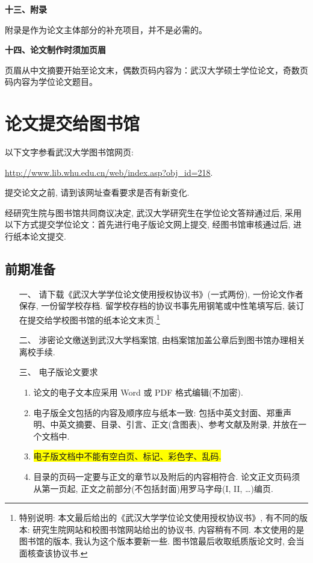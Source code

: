 \documentclass{WHUMaster}   %
\begin{document}
\textbf{十三、附录}

附录是作为论文主体部分的补充项目，并不是必需的。



\textbf{十四、论文制作时须加页眉}


页眉从中文摘要开始至论文末，偶数页码内容为：武汉大学硕士学位论文，奇数页码内容为学位论文题目。



\chapter{论文提交给图书馆}


{\kaishu 以下文字参看武汉大学图书馆网页:
 \begin{center}
 \url{http://www.lib.whu.edu.cn/web/index.asp?obj_id=218}.
 \end{center}
 提交论文之前, 请到该网址查看要求是否有新变化.}

 \bigskip

    经研究生院与图书馆共同商议决定, 武汉大学研究生在学位论文答辩通过后,
    采用以下方式提交学位论文：首先进行电子版论文网上提交, 经图书馆审核通过后, 进行纸本论文提交.

\section*{前期准备}
\begin{itemize}
  \item[一、] 请下载《武汉大学学位论文使用授权协议书》(一式两份), 一份论文作者保存, 一份留学校存档.
    留学校存档的协议书事先用钢笔或中性笔填写后,  装订在提交给学校图书馆的纸本论文末页.\footnote{\heiti 特别说明:
    本文最后给出的《武汉大学学位论文使用授权协议书》, 有不同的版本: 研究生院网站和校图书馆网站给出的协议书, 内容稍有不同.
    本文使用的是图书馆的版本, 我认为这个版本要新一些. 图书馆最后收取纸质版论文时, 会当面核查该协议书.}

    \item[二、]涉密论文缴送到武汉大学档案馆, 由档案馆加盖公章后到图书馆办理相关离校手续.

    \item[三、]电子版论文要求
\begin{enumerate}[1.]
  \item 论文的电子文本应采用 Word 或 PDF 格式编辑(不加密).
  \item 电子版全文包括的内容及顺序应与纸本一致: 包括中英文封面、郑重声明、中英文摘要、目录、引言、正文(含图表)、参考文献及附录, 并放在一个文档中.
  \item \colorbox{yellow}{电子版文档中不能有空白页、标记、彩色字、乱码.}
  \item 目录的页码一定要与正文的章节以及附后的内容相符合. 论文正文页码须从第一页起, 正文之前部分(不包括封面)用罗马字母(I, II, \dots)编页.
\end{enumerate}
\end{itemize}
\end{document}
